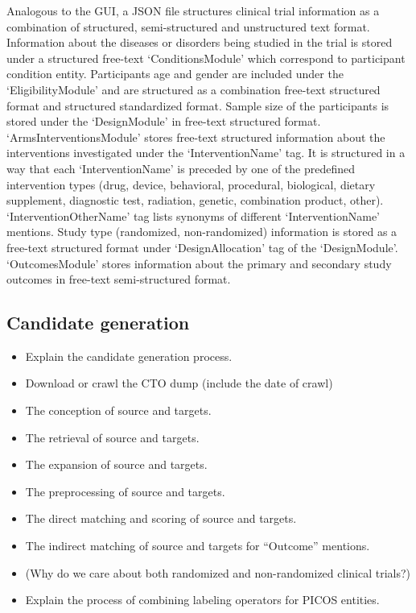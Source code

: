 \documentclass[10.7pt,]{article}
\begin{document}
Analogous to the GUI, a JSON file structures clinical trial information as a combination of structured, semi-structured and unstructured text format.
Information about the diseases or disorders being studied in the trial is stored under a structured free-text `ConditionsModule' which correspond to participant condition entity.
Participants age and gender are included under the `EligibilityModule' and are structured as a combination free-text structured format and structured standardized format. 
Sample size of the participants is stored under the `DesignModule' in free-text structured format.
`ArmsInterventionsModule' stores free-text structured information about the interventions investigated under the `InterventionName' tag. 
It is structured in a way that each `InterventionName' is preceded by one of the predefined intervention types (drug, device, behavioral, procedural, biological, dietary supplement, diagnostic test, radiation, genetic, combination product, other).
`InterventionOtherName' tag lists synonyms of different `InterventionName' mentions.
Study type (randomized, non-randomized) information is stored as a free-text structured format under `DesignAllocation' tag of the `DesignModule'.
`OutcomesModule' stores information about the primary and secondary study outcomes in free-text semi-structured format. 
%
%
%
\subsection{Candidate generation}\label{candgen}

\begin{itemize}
    \item Explain the candidate generation process.
    \item Download or crawl the CTO dump (include the date of crawl)
    \item The conception of source and targets.
    \item The retrieval of source and targets.
    \item The expansion of source and targets.
    \item The preprocessing of source and targets.
    \item The direct matching and scoring of source and targets.
    \item The indirect matching of source and targets for ``Outcome'' mentions.
    \item (Why do we care about both randomized and non-randomized clinical trials?)
    \item Explain the process of combining labeling operators for PICOS entities.
\end{itemize}
%
%
%
\end{document}
